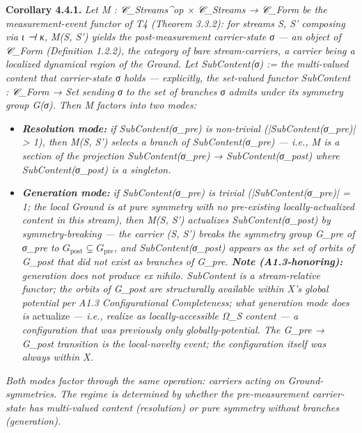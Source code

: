 \documentclass[11pt, openany]{book}
\begin{document}
\textbf{Corollary 4.4.1.} \textit{Let M : 𝒞\_\allowbreak{}Streams\textasciicircum{}op × 𝒞\_\allowbreak{}Streams → 𝒞\_\allowbreak{}Form be the measurement-event functor of T4 (Theorem 3.3.2): for streams S, S' composing via ι ⊣ κ, M(S, S') yields the post-measurement carrier-state σ --- an object of 𝒞\_\allowbreak{}Form (Definition 1.2.2), the category of bare stream-carriers, a carrier being a localized dynamical region of the Ground. Let SubContent(σ) := the multi-valued content that carrier-state σ holds --- explicitly, the set-valued functor SubContent : 𝒞\_\allowbreak{}Form → Set sending σ to the set of branches σ admits under its symmetry group G(σ). Then M factors into two modes:}

\begin{itemize}
\item \textbf{\textit{Resolution mode:}} \textit{if SubContent(σ\_\allowbreak{}pre) is non-trivial (|SubContent(σ\_\allowbreak{}pre)| > 1), then M(S, S') selects a branch of SubContent(σ\_\allowbreak{}pre) --- i.e., M is a section of the projection SubContent(σ\_\allowbreak{}pre) → SubContent(σ\_\allowbreak{}post) where SubContent(σ\_\allowbreak{}post) is a singleton.}
\item \textbf{\textit{Generation mode:}} \textit{if SubContent(σ\_\allowbreak{}pre) is trivial (|SubContent(σ\_\allowbreak{}pre)| = 1; the local Ground is at pure symmetry with no pre-existing locally-actualized content in this stream), then M(S, S') actualizes SubContent(σ\_\allowbreak{}post) by symmetry-breaking --- the carrier (S, S') breaks the symmetry group G\_\allowbreak{}pre of σ\_\allowbreak{}pre to $G_\mathrm{post} \subsetneq G_\mathrm{pre}$, and SubContent(σ\_\allowbreak{}post) appears as the set of orbits of G\_\allowbreak{}post that did not exist as branches of G\_\allowbreak{}pre. \textbf{Note (A1.3-honoring):} generation does not produce ex nihilo. SubContent is a stream-relative functor; the orbits of G\_\allowbreak{}post are structurally available within X's global potential per A1.3 Configurational Completeness; what generation mode does is }actualize\textit{ --- i.e., realize as locally-accessible Ω\_\allowbreak{}S content --- a configuration that was previously only globally-potential. The G\_\allowbreak{}pre → G\_\allowbreak{}post transition is the local-novelty event; the configuration itself was always within X.}
\end{itemize}

\textit{Both modes factor through the same operation: carriers acting on Ground-symmetries. The regime is determined by whether the pre-measurement carrier-state has multi-valued content (resolution) or pure symmetry without branches (generation).}
\end{document}
